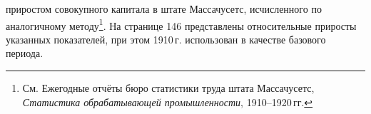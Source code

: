 \documentclass[leqno]{article}  %
\begin{document}
приростом совокупного капитала в штате Массачусетс, исчисленного по аналогичному методу\footnote{См. Ежегодные отчёты бюро статистики труда штата Массачусетс, \emph{Статистика обрабатывающей промышленности}, 1910--1920\,гг.}. На странице 146 представлены относительные приросты указанных показателей, при этом 1910\,г. использован в качестве базового периода.
\par
\end{document}

